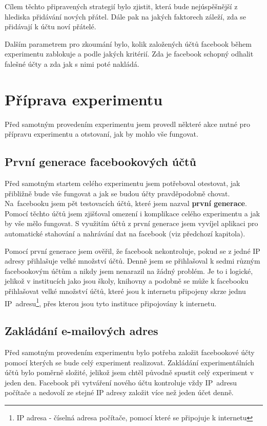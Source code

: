 \documentclass[thesis=M,czech]{FITthesis}[2013/05/10]
\begin{document}
Cílem těchto připravených strategií bylo zjistit, která bude nejúspěšnější z hlediska přidávání nových přátel. Dále pak na jakých faktorech záleží, zda se přidávají k účtu noví přátelé.

Dalším parametrem pro zkoumání bylo, kolik založených účtů facebook během experimentu zablokuje a podle jakých kritérií. Zda je facebook schopný odhalit falešné účty a zda jak s nimi poté nakládá.

\section{Příprava experimentu}

Před samotným provedením experimentu jsem provedl některé akce nutné pro přípravu experimentu a otstovaní, jak by mohlo vše fungovat.

\subsection{První generace facebookových účtů}

Před samotným startem celého experimentu jsem potřeboval otestovat, jak přibližně bude vše fungovat a jak se budou účty pravděpodobně chovat. Na~facebooku jsem pět testovacích účtů, které jsem nazval \textbf{první generace}. Pomocí těchto účtů jsem zjišťoval omezení i komplikace celého experimentu a jak by vše mělo fungovat. S využitím účtů z první generace jsem vyvíjel aplikaci pro automatické stahování a nahrávání dat na facebook (viz předchozí kapitola).

Pomocí první generace jsem ověřil, že facebook nekontroluje, pokud se z jedné IP adresy přihlašuje velké množství účtů. Denně jsem se přihlašoval k sedmi různým facebookovým účtům a nikdy jsem nenarazil na žádný problém. Je to i logické, jelikož v institucích jako jsou školy, knihovny a podobně se může k facebooku přihlašovat velké množství účtů, které jsou k internetu připojeny skrze jednu IP~adresu\footnote{IP adresa - číselná adresa počítače, pomocí které se připojuje k internetu}, přes kterou jsou tyto instituce připojovány k internetu.


\subsection{Zakládání e-mailových adres}

Před samotným provedením experimentu bylo potřeba založit facebookové účty pomocí kterých se bude celý experiment realizovat. Zakládání experimentálních účtů bylo poměrně složité, jelikož jsem chtěl původně spustit celý experiment v jeden den. Facebook při vytváření nového účtu kontroluje vždy IP~adresu počítače a nedovolí ze stejné IP adresy založit více než jeden účet denně. 
\end{document}

